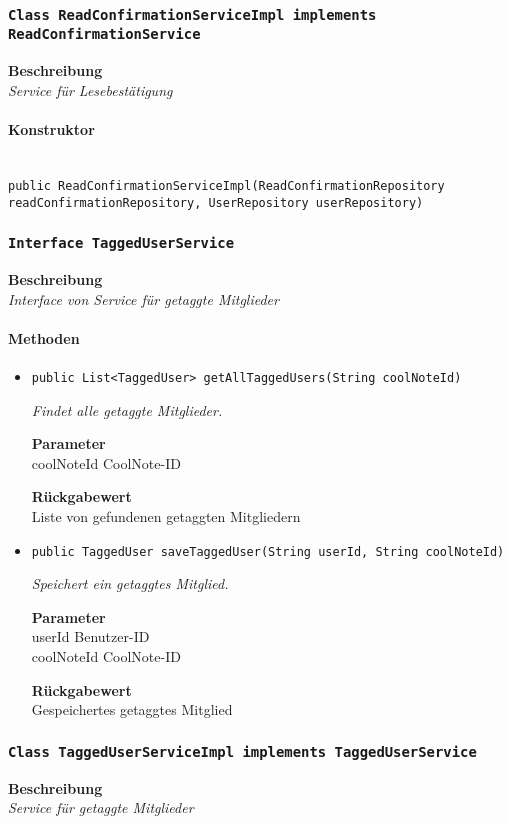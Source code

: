      \subsubsection{\texttt{Class ReadConfirmationServiceImpl implements ReadConfirmationService}}
     \textbf{Beschreibung} \\
     \textit{Service für Lesebestätigung}
     \paragraph*{Konstruktor}\mbox{} \\
     \texttt{public ReadConfirmationServiceImpl(ReadConfirmationRepository readConfirmationRepository, UserRepository userRepository)} \\
     \subsubsection{\texttt{Interface TaggedUserService}}
     \textbf{Beschreibung} \\
     \textit{Interface von Service für getaggte Mitglieder}
     \paragraph*{Methoden}
     \begin{itemize}
     	\item{\texttt{public List<TaggedUser> getAllTaggedUsers(String coolNoteId)}}
     	
     	\textit{Findet alle getaggte Mitglieder.}
     	
     	\textbf{Parameter} \\
     	coolNoteId CoolNote-ID
     	
     	\textbf{Rückgabewert} \\
     	Liste von gefundenen getaggten Mitgliedern        \item{\texttt{public TaggedUser saveTaggedUser(String userId, String coolNoteId)}}
     	
     	\textit{Speichert ein getaggtes Mitglied.}
     	
     	\textbf{Parameter} \\
     	userId Benutzer-ID\\
     	coolNoteId CoolNote-ID
     	
     	\textbf{Rückgabewert} \\
     	Gespeichertes getaggtes Mitglied
     \end{itemize}
     \subsubsection{\texttt{Class TaggedUserServiceImpl implements TaggedUserService}}
     \textbf{Beschreibung} \\
     \textit{Service für getaggte Mitglieder}
